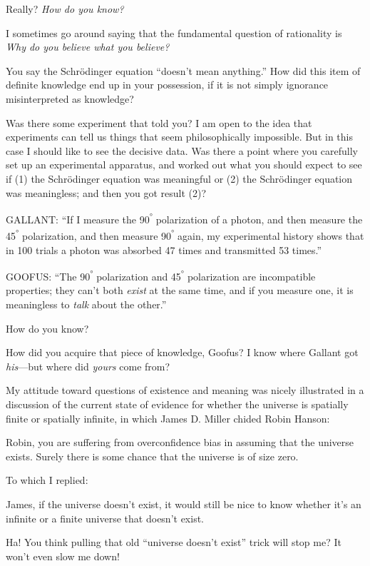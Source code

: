 {
 Really? \textit{How do you know?}}

{
 I sometimes go around saying that the fundamental question of
rationality is \textit{Why do you believe what you believe?}}

{
 You say the Schrödinger equation
``doesn't mean
anything.'' How did this item of definite knowledge
end up in your possession, if it is not simply ignorance misinterpreted
as knowledge?}

{
 Was there some experiment that told you? I am open to the idea
that experiments can tell us things that seem philosophically
impossible. But in this case I should like to see the decisive data.
Was there a point where you carefully set up an experimental apparatus,
and worked out what you should expect to see if (1) the Schrödinger
equation was meaningful or (2) the Schrödinger equation was
meaningless; and then you got result (2)?}

{
 GALLANT: ``If I measure the 90\textsuperscript{°}
polarization of a photon, and then measure the 45\textsuperscript{°}
polarization, and then measure 90\textsuperscript{°} again, my
experimental history shows that in 100 trials a photon was absorbed 47
times and transmitted 53 times.''}

{
 GOOFUS: ``The 90\textsuperscript{°} polarization
and 45\textsuperscript{°} polarization are incompatible properties;
they can't both \textit{exist} at the same time, and if
you measure one, it is meaningless to \textit{talk} about the
other.''}

{
 How do you know?}

{
 How did you acquire that piece of knowledge, Goofus? I know where
Gallant got \textit{his}{}---but where did \textit{yours} come from?}

{
 My attitude toward questions of existence and meaning was nicely
illustrated in a discussion of the current state of evidence for
whether the universe is spatially finite or spatially infinite, in
which James D. Miller chided Robin Hanson:}

{
 Robin, you are suffering from overconfidence bias in assuming that
the universe exists. Surely there is some chance that the universe is
of size zero.}

{
 To which I replied:}

{
 James, if the universe doesn't exist, it would
still be nice to know whether it's an infinite or a
finite universe that doesn't exist.}

{
 Ha! You think pulling that old ``universe
doesn't exist'' trick will stop me?
It won't even slow me down!}


